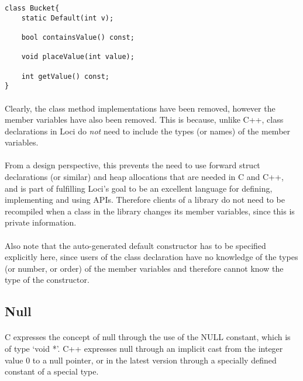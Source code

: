 \documentclass[12pt,twoside,notitlepage]{report}
\begin{document}
\begin{lstlisting}
class Bucket{
	static Default(int v);

	bool containsValue() const;
	
	void placeValue(int value);
	
	int getValue() const;
}
\end{lstlisting}


\paragraph{}
Clearly, the class method implementations have been removed, however the member variables have also been removed. This is because, unlike C++, class declarations in Loci do \emph{not} need to include the types (or names) of the member variables.

\paragraph{}
From a design perspective, this prevents the need to use forward struct declarations (or similar) and heap allocations that are needed in C and C++, and is part of fulfilling Loci's goal to be an excellent language for defining, implementing and using APIs. Therefore clients of a library do not need to be recompiled when a class in the library changes its member variables, since this is private information.

\paragraph{}
Also note that the auto-generated default constructor has to be specified explicitly here, since users of the class declaration have no knowledge of the types (or number, or order) of the member variables and therefore cannot know the type of the constructor.

\clearpage

\subsection{Null}

\paragraph{}
C expresses the concept of null through the use of the NULL constant, which is of type `void *'. C++ expresses null through an implicit cast from the integer value 0 to a null pointer, or in the latest version through a specially defined constant of a special type.
\end{document}
